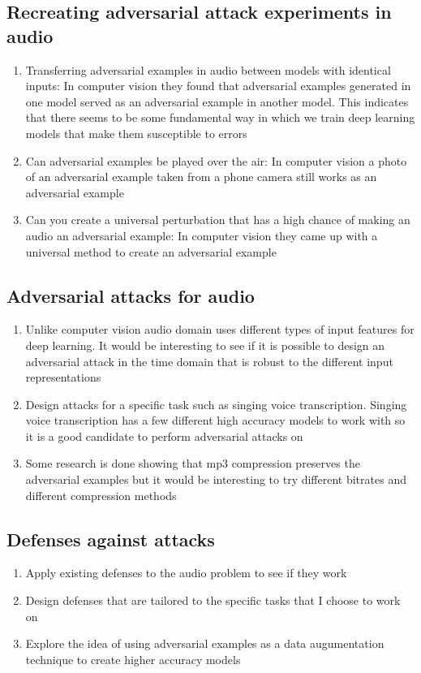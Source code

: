 \documentclass[journal,onecolumn]{IEEEtran}
\begin{document}
\subsection{Recreating adversarial attack experiments in audio}
\begin{enumerate}
\item Transferring adversarial examples in audio between models with identical inputs: In computer vision they found that adversarial examples generated in one model served as an adversarial example in another model. This indicates that there seems to be some fundamental way in which we train deep learning models that make them susceptible to errors
\item Can adversarial examples be played over the air: In computer vision a photo of an adversarial example taken from a phone camera still works as an adversarial example
\item Can you create a universal perturbation that has a high chance of making an audio an adversarial example: In computer vision they came up with a universal method to create an adversarial example
\end{enumerate}

\subsection{Adversarial attacks for audio}
\begin{enumerate}
\item Unlike computer vision audio domain uses different types of input features for deep learning. It would be interesting to see if it is possible to design an adversarial attack in the time domain that is robust to the different input representations
\item Design attacks for a specific task such as singing voice transcription. Singing voice transcription has a few different high accuracy models to work with so it is a good candidate to perform adversarial attacks on
\item Some research is done showing that mp3 compression preserves the adversarial examples but it would be interesting to try different bitrates and different compression methods
\end{enumerate}

\subsection{Defenses against attacks}
\begin{enumerate}
\item  Apply existing defenses to the audio problem to see if they work
\item Design defenses that are tailored to the specific tasks that I choose to work on
\item Explore the idea of using adversarial examples as a data augumentation technique to create higher accuracy models
\end{enumerate}
\end{document}
